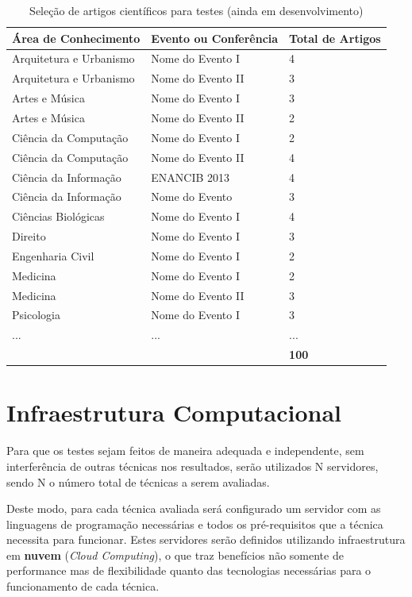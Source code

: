 \documentclass[
	12pt,               %
	openright,          %
	twoside,            %
	a4paper,            %
	english,            %
	brazil              %
	]{abntex2}
\begin{document}
\begin{table}
    \caption{Seleção de artigos científicos para testes (ainda em desenvolvimento)}
    \begin{center}
        \begin{tabular}{l|l|l}
            Área de Conhecimento & Evento ou Conferência & Total de Artigos \\ 
            \hline
            Arquitetura e Urbanismo & Nome do Evento I & 4 \\ 
			Arquitetura e Urbanismo & Nome do Evento II & 3 \\ 
			Artes e Música & Nome do Evento I & 3 \\ 
			Artes e Música & Nome do Evento II & 2 \\ 
            Ciência da Computação & Nome do Evento I & 2 \\
			Ciência da Computação & Nome do Evento II & 4 \\
            Ciência da Informação & ENANCIB 2013 & 4 \\
            Ciência da Informação & Nome do Evento & 3 \\
            Ciências Biológicas & Nome do Evento I & 4 \\
            Direito & Nome do Evento I & 3 \\
            Engenharia Civil & Nome do Evento I & 2 \\
            Medicina & Nome do Evento I & 2 \\ 
            Medicina & Nome do Evento II & 3 \\ 
            Psicologia & Nome do Evento I & 3 \\
            ... & ... & ... \\
            \hline
             & & \textbf{100}
        \end{tabular}
    \end{center}
    \label{tab:papers-list}
\end{table}

\section{Infraestrutura Computacional}

Para que os testes sejam feitos de maneira adequada e independente, sem interferência de outras técnicas nos resultados, serão utilizados N servidores, sendo N o número total de técnicas a serem avaliadas.

Deste modo, para cada técnica avaliada será configurado um servidor com as linguagens de programação necessárias e todos os pré-requisitos que a técnica necessita para funcionar. Estes servidores serão definidos utilizando infraestrutura em \textbf{nuvem} (\textit{Cloud Computing}), o que traz benefícios não somente de performance mas de flexibilidade quanto das tecnologias necessárias para o funcionamento de cada técnica.
\end{document}
